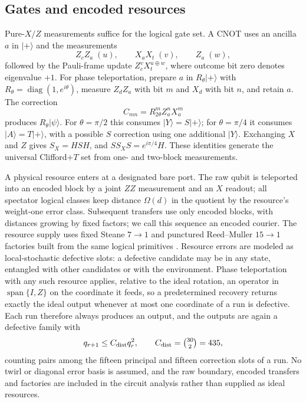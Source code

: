 \documentclass[10pt,a4paper,twocolumn]{article}
\begin{document}
\subsection{Gates and encoded resources}
\label{sec:gates}
Pure-$X/Z$ measurements suffice for the logical gate set.  A CNOT uses an
ancilla $a$ in $|+\rangle$ and the measurements
\begin{equation}
 Z_cZ_a\;(u),\qquad X_aX_t\;(v),\qquad Z_a\;(w),
 \label{eq:cnot}
\end{equation}
followed by the Pauli-frame update $Z_c^vX_t^{u\oplus w}$, where outcome bit
zero denotes eigenvalue $+1$.  For phase teleportation, prepare $a$ in
$R_\theta|+\rangle$ with $R_\theta=\operatorname{diag}(1,e^{i\theta})$, measure
$Z_dZ_a$ with bit $m$ and $X_d$ with bit $n$, and retain $a$.  The correction
\begin{equation}
 C_{mn}=R_{2\theta}^{m}Z_a^nX_a^m
 \label{eq:phase}
\end{equation}
produces $R_\theta|\psi\rangle$.  For $\theta=\pi/2$ this consumes
$|Y\rangle=S|+\rangle$; for $\theta=\pi/4$ it consumes $|A\rangle=T|+\rangle$,
with a possible $S$ correction using one additional $|Y\rangle$.  Exchanging $X$
and $Z$ gives $S_X=HSH$, and $SS_XS=e^{i\pi/4}H$.  These identities generate the
universal Clifford+$T$ set from one- and two-block measurements.

A physical resource enters at a designated bare port.  The raw qubit is
teleported into an encoded block by a joint $ZZ$ measurement and an $X$ readout;
all spectator logical classes keep distance $\Omega(d)$ in the quotient by the
resource's weight-one error class.  Subsequent transfers use only encoded
blocks, with distances growing by fixed factors; we call this sequence an
encoded courier.  The resource supply uses fixed Steane $7\!\to\!1$ and
punctured Reed--Muller $15\!\to\!1$ factories built from the same logical
primitives \cite{BravyiKitaev,Reichardt,LitinskiMSD}.  Resource errors are
modeled as local-stochastic defective slots: a defective candidate may be in any
state, entangled with other candidates or with the environment.  Phase
teleportation with any such resource applies, relative to the ideal rotation, an
operator in $\operatorname{span}\{I,Z\}$ on the coordinate it feeds, so a
predetermined recovery returns exactly the ideal output whenever at most one
coordinate of a run is defective.  Each run therefore always produces an output,
and the outputs are again a defective family with
\begin{equation}
 q_{r+1}\le C_{\rm dist}q_r^2,\qquad C_{\rm dist}=\tbinom{30}{2}=435,
 \label{eq:distill}
\end{equation}
counting pairs among the fifteen principal and fifteen correction slots of a
run.  No twirl or diagonal error basis is assumed, and the raw boundary, encoded
transfers and factories are included in the circuit analysis rather than
supplied as ideal resources.
\end{document}
